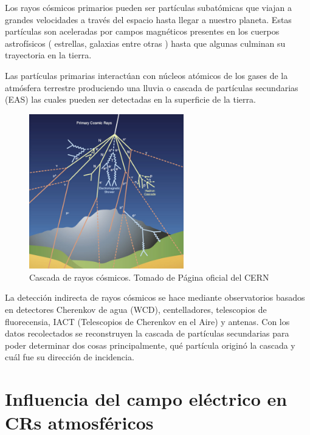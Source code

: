 \documentclass[12pt,a4paper,oneside]{book}
\begin{document}
Los rayos cósmicos primarios pueden ser partículas subatómicas que viajan a grandes velocidades a través del espacio hasta llegar a nuestro planeta. Estas partículas son aceleradas por campos magnéticos presentes en los cuerpos astrofísicos ( estrellas, galaxias entre otras ) hasta que algunas culminan su trayectoria en la tierra. \medskip


Las partículas primarias interactúan con núcleos atómicos de los gases de la atmósfera terrestre produciendo una lluvia o cascada de partículas secundarias (EAS) las cuales pueden ser detectadas en la superficie de la tierra.\medskip



\begin{figure}[ht]
  \centering
  \includegraphics[width=0.6\textwidth]{c.jpg}
  \caption{Cascada de rayos cósmicos. Tomado de Página oficial del CERN}
  \label{fig1}
\end{figure}


La detección indirecta de rayos cósmicos se hace mediante observatorios basados en detectores Cherenkov de agua (WCD), centelladores, telescopios de fluorecensia, IACT (Telescopios de Cherenkov en el Aire) y antenas. Con los datos recolectados se reconstruyen la cascada de partículas secundarias para poder determinar dos cosas principalmente, qué partícula originó la cascada y cuál fue su dirección de incidencia. \medskip


\section{Influencia del campo eléctrico en CRs atmosféricos }
\end{document}
